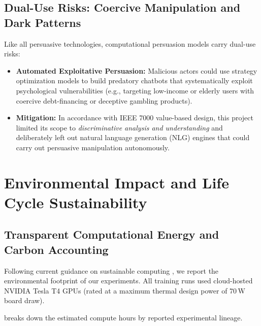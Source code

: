 \subsection{Dual-Use Risks: Coercive Manipulation and Dark Patterns}
Like all persuasive technologies, computational persuasion models carry dual-use risks:
\begin{itemize}
  \item \textbf{Automated Exploitative Persuasion:} Malicious actors could use strategy optimization models to build predatory chatbots that systematically exploit psychological vulnerabilities (e.g., targeting low-income or elderly users with coercive debt-financing or deceptive gambling products).
  \item \textbf{Mitigation:} In accordance with IEEE 7000 value-based design, this project limited its scope to \textit{discriminative analysis and understanding} and deliberately left out natural language generation (NLG) engines that could carry out persuasive manipulation autonomously.
\end{itemize}

\section{Environmental Impact and Life Cycle Sustainability}
\label{sec:sustainability}

\subsection{Transparent Computational Energy and Carbon Accounting}
Following current guidance on sustainable computing \cite{strubell2019energy,lacoste2019quantifying}, we report the environmental footprint of our experiments. All training runs used cloud-hosted NVIDIA Tesla T4 GPUs (rated at a maximum thermal design power of 70\,W board draw). 

 breaks down the estimated compute hours by reported experimental lineage.

